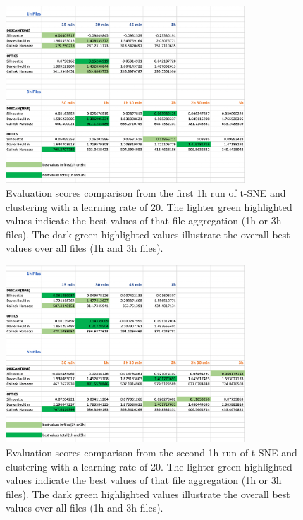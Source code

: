 

\begin{figure}[H]
  \centering
  \includegraphics[width=0.8\textwidth]{./images/clusteringResults/clusteringResults1.png}
  \caption{Evaluation scores comparison from the first 1h run of t-SNE and clustering with a learning rate of 20. The lighter green highlighted values indicate the best values of that file aggregation (1h or 3h files). The dark green highlighted values illustrate the overall best values over all files (1h and 3h files).}
  \label{figure:clusteringResults1}
\end{figure}

\begin{figure}[H]
  \centering
  \includegraphics[width=0.8\textwidth]{./images/clusteringResults/clusteringResults2.png}
  \caption{Evaluation scores comparison from the second 1h run of t-SNE and clustering with a learning rate of 20. The lighter green highlighted values indicate the best values of that file aggregation (1h or 3h files). The dark green highlighted values illustrate the overall best values over all files (1h and 3h files).}
  \label{figure:clusteringResults2}
\end{figure}


